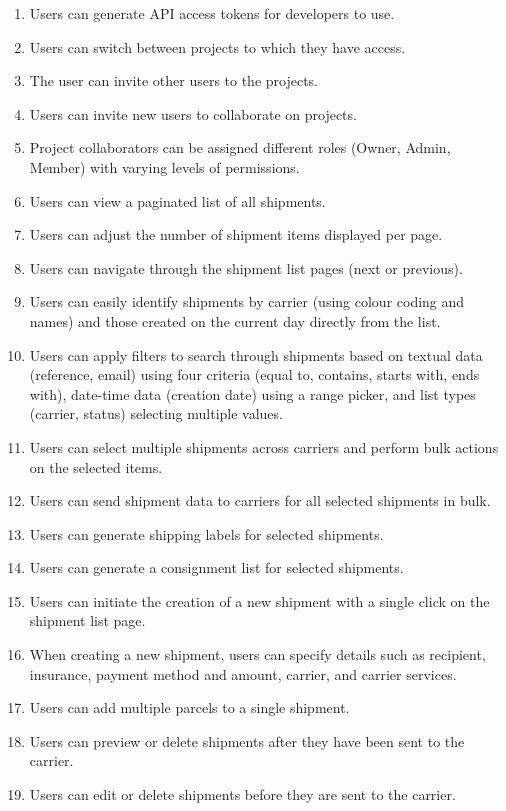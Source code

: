 \begin{enumerate}[label=\bfseries FR\arabic*:,leftmargin=*]
    \item Users can generate API access tokens for developers to use.
    \item Users can switch between projects to which they have access.
    \item The user can invite other users to the projects.
    \item Users can invite new users to collaborate on projects.
    \item Project collaborators can be assigned different roles (Owner, Admin, Member) with varying levels of permissions.
    \item Users can view a paginated list of all shipments.
    \item Users can adjust the number of shipment items displayed per page.
    \item Users can navigate through the shipment list pages (next or previous).
    \item Users can easily identify shipments by carrier (using colour coding and names) and those created on the current day directly from the list.
    \item Users can apply filters to search through shipments based on textual data (reference, email) using four criteria (equal to, contains, starts with, ends with), date-time data (creation date) using a range picker, and list types (carrier, status) selecting multiple values.
    \item Users can select multiple shipments across carriers and perform bulk actions on the selected items.
    \item Users can send shipment data to carriers for all selected shipments in bulk.
    \item Users can generate shipping labels for selected shipments.
    \item Users can generate a consignment list for selected shipments.
    \item Users can initiate the creation of a new shipment with a single click on the shipment list page.
    \item When creating a new shipment, users can specify details such as recipient, insurance, payment method and amount, carrier, and carrier services.
    \item Users can add multiple parcels to a single shipment.
    \item Users can preview or delete shipments after they have been sent to the carrier.
    \item Users can edit or delete shipments before they are sent to the carrier.

\end{enumerate}
